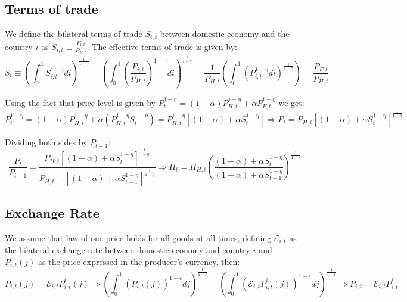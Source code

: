 \documentclass{article}
\newcommand{\E}{\mathcal{E}}
\begin{document}
\subsection{Terms of trade}
We define the bilateral terms of trade $S_{i,t}$ between domestic economy and the country $i$ as $S_{i,t} \equiv \frac{P_{i,t}}{P_{H,t}}$. The effective terms of trade is given by:
\begin{equation}
    S_t \equiv \left(\int^1_0 S_{i,t}^{1-\gamma} di \right)^{\frac{1}{1-\gamma}} = \left(\int^1_0 \left(\frac{P_{i,t}}{P_{H,t}}  \right)^{1-\gamma}  di \right)^{\frac{1}{1-\gamma}} = \frac{1}{P_{H,t}} \left(\int^1_0 \left(P_{i,t}^{1-\gamma} di \right)^{\frac{1}{1-\gamma}}\right) = \frac{P_{F,t}}{P_{H,t}}
\end{equation}

Using the fact that price level is given by $P_t^{1-\eta} = (1-\alpha) P_{H,t}^{1-\eta} + \alpha P_{F,t}^{1-\eta}$ we get:
\begin{equation}
    \label{tot_level}
    P_t^{1-\eta} = (1-\alpha) P_{H,t}^{1-\eta} + \alpha \left( P_{H,t}^{1-\eta} S_{t}^{1-\eta} \right) = P_{H,t}^{1-\eta} \left[(1-\alpha) + \alpha S_t^{1-\eta} \right] \Rightarrow P_t = P_{H,t} \left[(1-\alpha) + \alpha S_t^{1-\eta} \right]^{\frac{1}{1-\eta}} 
\end{equation}

Dividing both sides by $P_{t-1}$:
\begin{equation}
    \label{tot}
    \frac{P_t}{P_{t-1}} = \frac{P_{H,t} \left[(1-\alpha) + \alpha S_t^{1-\eta} \right]^{\frac{1}{1-\eta}}} {P_{H,t-1} \left[(1-\alpha) + \alpha S_{t-1}^{1-\eta} \right]^{\frac{1}{1-\eta}}} \Rightarrow \Pi_t = \Pi_{H,t} \left(\frac{(1-\alpha) + \alpha S_t^{1-\eta}} {(1-\alpha) + \alpha S_{t-1}^{1-\eta}} \right)^{\frac{1}{1-\eta}}
\end{equation}

\subsection{Exchange Rate}
We assume that law of one price holds for all goods at all times, defining $\E_{i,t}$ as the bilateral exchange rate between domestic economy and country $i$ and $P^i_{i,t}(j)$ as the price expressed in the producer's currency, then:
\begin{equation}
    P_{i,t}(j) = \E_{i,t} P^i_{i,t}(j) \Rightarrow \left( \int^1_0 \left(P_{i,t}(j) \right)^{1-\epsilon} dj \right)^{\frac{1}{1-\epsilon}} = \left( \int^1_0 \left(\E_{i,t} P^i_{i,t}(j) \right)^{1-\epsilon} dj \right)^{\frac{1}{1-\epsilon}} \Rightarrow P_{i,t} = \E_{i,t} P^i_{i,t}
\end{equation}
\end{document}
